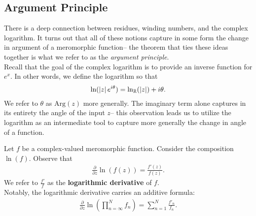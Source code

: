 \documentclass{memoir}
\begin{document}

\subsection{Argument Principle}
\label{sub:argument_principle}

There is a deep connection between residues, winding numbers, and the complex logarithm. It turns out that all of these notions capture in some form the change in argument of a meromorphic function-- the theorem that ties these ideas together is what we refer to as the \textit{argument principle}.\\

Recall that the goal of the complex logarithm is to provide an inverse function for \(e^{x}\). In other words, we define the logarithm so that
\begin{align*}
	\ln(\left| z \right| e^{i \theta }) = \ln_{\mathbb{R}} (\left| z \right| ) + i \theta .
\end{align*}
We refer to \(\theta \) as \(\textrm{Arg}(z)\) more generally. The imaginary term alone captures in its entirety the angle of the input \(z\)-- this observation leads us to utilize the logarithm as an intermediate tool to capture more generally the change in angle of a function.

\begin{general}
	Let \(f\) be a complex-valued meromorphic function. Consider the composition \(\ln(f)\). Observe that
	\begin{align*}
		\frac{\partial }{\partial z} \ln(f(z)) = \frac{f'(z)}{f(z)}.
	\end{align*}
	We refer to \(\frac{f'}{f}\) as the \textbf{logarithmic derivative} of \(f\). \\

	Notably, the logarithmic derivative carries an additive formula:
	\begin{align*}
		\frac{\partial }{\partial z} \ln\left( \prod_{n=\infty}^{N} f_n  \right) = \sum_{n=1}^{N} \frac{f'_n}{f_n}.
	\end{align*}
\end{general}
\end{document}
